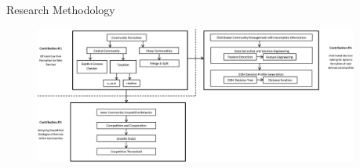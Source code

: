 \documentclass{beamer}
\begin{document}
\begin{frame}{Research Methodology}
    \begin{figure}[!t]
        \centering
        \includegraphics[width=4.2in]{figures/structure2.eps}
        \label{questionfig}
    \end{figure}
\end{frame}





\end{document}
